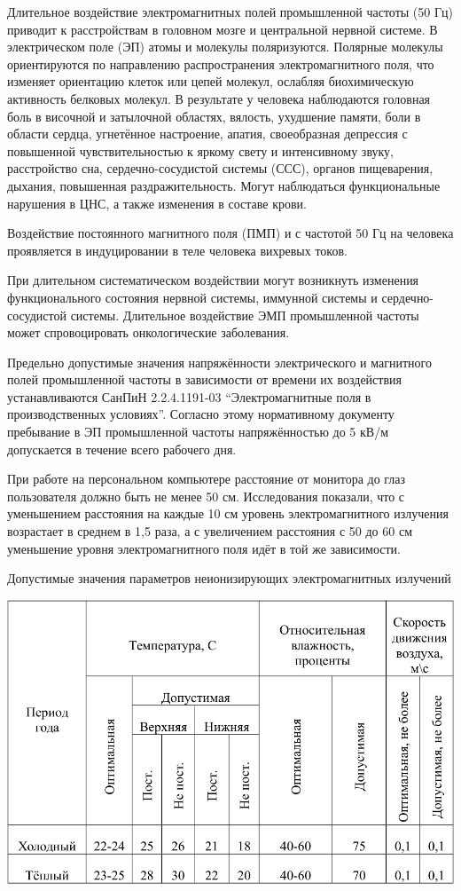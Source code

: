 Длительное воздействие электромагнитных полей промышленной частоты (50 Гц) приводит к расстройствам в головном мозге и центральной нервной системе. В электрическом поле (ЭП) атомы и молекулы поляризуются.
Полярные молекулы ориентируются по направлению распространения электромагнитного поля, что изменяет ориентацию клеток или цепей молекул, ослабляя биохимическую активность белковых молекул.
В результате у человека наблюдаются головная боль в височной и затылочной областях, вялость, ухудшение памяти, боли в области сердца, угнетённое настроение, апатия, своеобразная депрессия с повышенной чувствительностью к яркому свету и интенсивному звуку, расстройство сна, сердечно-сосудистой системы (ССС), органов пищеварения, дыхания, повышенная раздражительность.
Могут наблюдаться функциональные нарушения в ЦНС, а также изменения в составе крови.

Воздействие постоянного магнитного поля (ПМП) и с частотой 50 Гц на человека проявляется в индуцировании в теле человека вихревых токов.

При длительном систематическом воздействии могут возникнуть изменения функционального состояния нервной системы, иммунной системы и сердечно-сосудистой системы. Длительное воздействие ЭМП промышленной частоты может спровоцировать онкологические заболевания.

Предельно допустимые значения напряжённости электрического и магнитного полей промышленной частоты в зависимости от времени их воздействия устанавливаются СанПиН 2.2.4.1191-03 ``Электромагнитные поля в производственных условиях''\cite{OT12}. Согласно этому нормативному документу пребывание в ЭП промышленной частоты напряжённостью до 5 кВ/м допускается в течение всего рабочего дня.

При работе на персональном компьютере расстояние от монитора до глаз пользователя должно быть не менее 50 см. Исследования показали, что с уменьшением расстояния на каждые 10 см уровень электромагнитного излучения возрастает в среднем в 1,5 раза, а с увеличением расстояния с 50 до 60 см уменьшение уровня электромагнитного поля идёт в той же зависимости.

\begin{table}[!ht]
\caption{Допустимые значения параметров неионизирующих электромагнитных излучений}
\centering
\includegraphics[page=3, width=1\linewidth]{secure_table.pdf}
\label{tab:min_neoinige_elwave}
\end{table}

